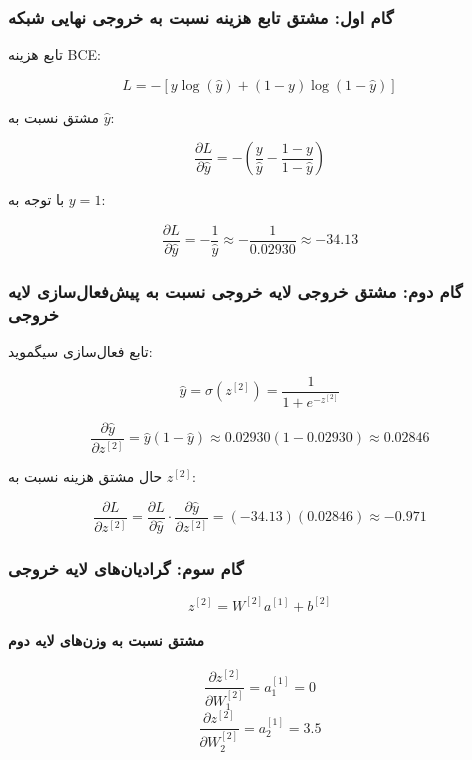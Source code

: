 \documentclass{article}
\begin{document}
\subsubsection*{گام اول: مشتق تابع هزینه نسبت به خروجی نهایی شبکه}

تابع هزینه BCE:

\[
L = -\left[y\log(\hat{y})+(1-y)\log(1-\hat{y})\right]
\]

مشتق نسبت به \(\hat{y}\):

\[
\frac{\partial L}{\partial \hat{y}}
=
-\left(\frac{y}{\hat{y}}-\frac{1-y}{1-\hat{y}}\right)
\]

با توجه به \(y=1\):

\[
\frac{\partial L}{\partial \hat{y}}
=
-\frac{1}{\hat{y}}
\approx
-\frac{1}{0.02930}
\approx -34.13
\]

\subsubsection*{گام دوم: مشتق خروجی لایه خروجی نسبت به پیش‌فعال‌سازی لایه خروجی}

تابع فعال‌سازی سیگموید:

\[
\hat{y} = \sigma(z^{[2]}) = \frac{1}{1+e^{-z^{[2]}}}
\]

\[
\frac{\partial \hat{y}}{\partial z^{[2]}}
=
\hat{y}(1-\hat{y})
\approx
0.02930(1-0.02930)
\approx 0.02846
\]

حال مشتق هزینه نسبت به \(z^{[2]}\):

\[
\frac{\partial L}{\partial z^{[2]}}
=
\frac{\partial L}{\partial \hat{y}}
\cdot
\frac{\partial \hat{y}}{\partial z^{[2]}}
=
(-34.13)(0.02846)
\approx -0.971
\]

\subsubsection*{گام سوم: گرادیان‌های لایه خروجی}

\[
z^{[2]} = W^{[2]} a^{[1]} + b^{[2]}
\]

\paragraph{مشتق نسبت به وزن‌های لایه دوم}

\[
\frac{\partial z^{[2]}}{\partial W^{[2]}_1} = a^{[1]}_1 = 0
\]
\[
\frac{\partial z^{[2]}}{\partial W^{[2]}_2} = a^{[1]}_2 = 3.5
\]
\end{document}

